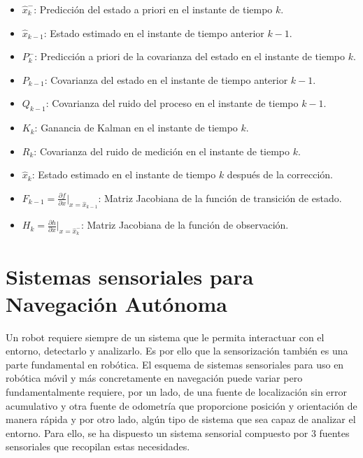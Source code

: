 \begin{itemize}
    \item \( \hat{x}_k^- \): Predicción del estado a priori en el instante de tiempo \( k \).
    \item \( \hat{x}_{k-1} \): Estado estimado en el instante de tiempo anterior \( k-1 \).
    \item \( P_k^- \): Predicción a priori de la covarianza del estado en el instante de tiempo \( k \).
    \item \( P_{k-1} \): Covarianza del estado en el instante de tiempo anterior \( k-1 \).
    \item \( Q_{k-1} \): Covarianza del ruido del proceso en el instante de tiempo \( k-1 \).
    \item \( K_k \): Ganancia de Kalman en el instante de tiempo \( k \).
    \item \( R_k \): Covarianza del ruido de medición en el instante de tiempo \( k \).
    \item \( \hat{x}_k \): Estado estimado en el instante de tiempo \( k \) después de la corrección.
    \item \( F_{k-1} = \frac{\partial f}{\partial x}\Bigg|_{x=\hat{x}_{k-1}} \): Matriz Jacobiana de la función de transición de estado.
    \item \( H_k = \frac{\partial h}{\partial x}\Bigg|_{x=\hat{x}_k^-} \): Matriz Jacobiana de la función de observación.
\end{itemize}



\section{Sistemas sensoriales para Navegación Autónoma}

Un robot requiere siempre de un sistema que le permita interactuar con el entorno, detectarlo y analizarlo. Es por ello que la sensorización 
también es una parte fundamental en robótica. El esquema de sistemas sensoriales para uso en robótica móvil y más concretamente en navegación 
puede variar pero fundamentalmente requiere, por un lado, de una fuente de localización sin error acumulativo y otra fuente de odometría que proporcione posición y orientación 
de manera rápida y por otro lado, algún tipo de sistema que sea capaz de analizar el entorno. Para ello, se ha dispuesto un sistema sensorial 
compuesto por 3 fuentes sensoriales que recopilan estas necesidades.
